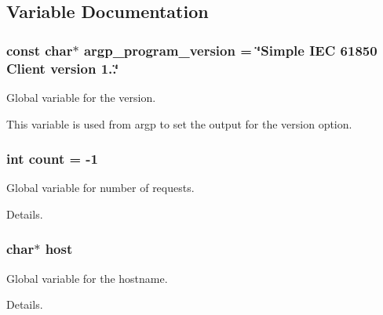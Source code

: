 \subsection{Variable Documentation}
\subsubsection[{\texorpdfstring{argp\+\_\+program\+\_\+version}{argp_program_version}}]{\setlength{\rightskip}{0pt plus 5cm}const char$\ast$ argp\+\_\+program\+\_\+version = \char`\"{}Simple I\+EC 61850 Client version 1..\char`\"{}}\hypertarget{simple-iec61850-client_8c_a62f73ea01c816f1996aed4c66f57c4fb}{}\label{simple-iec61850-client_8c_a62f73ea01c816f1996aed4c66f57c4fb}


Global variable for the version. 

This variable is used from argp to set the output for the version option. 
\subsubsection[{\texorpdfstring{count}{count}}]{\setlength{\rightskip}{0pt plus 5cm}int count = -\/1}\hypertarget{simple-iec61850-client_8c_ad43c3812e6d13e0518d9f8b8f463ffcf}{}\label{simple-iec61850-client_8c_ad43c3812e6d13e0518d9f8b8f463ffcf}


Global variable for number of requests. 

Details. 
\subsubsection[{\texorpdfstring{host}{host}}]{\setlength{\rightskip}{0pt plus 5cm}char$\ast$ host}\hypertarget{simple-iec61850-client_8c_a1c2046dcb30a629d6d9f45ff8f403f12}{}\label{simple-iec61850-client_8c_a1c2046dcb30a629d6d9f45ff8f403f12}


Global variable for the hostname. 

Details. 
